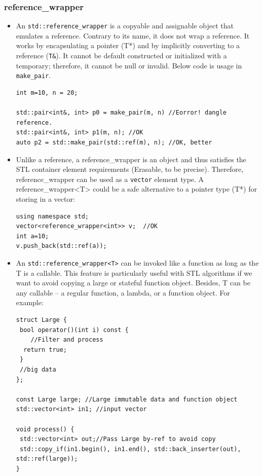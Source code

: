 \documentclass[a4paper,11pt,twoside]{book}
\begin{document}
\subsubsection{reference\_wrapper}
\begin{itemize}
    \item An \texttt{std::reference\_wrapper} is a copyable and assignable object that emulates a reference. Contrary to its name, it does not wrap a reference. It works by encapsulating a pointer (T*) and by implicitly converting to a reference (\texttt{T\&}). It cannot be default constructed or initialized with a temporary; therefore, it cannot be null or invalid. Below code is usage in \texttt{make\_pair}. 
\begin{lstlisting}
int m=10, n = 20;

std::pair<int&, int> p0 = make_pair(m, n) //Eorror! dangle reference.
std::pair<int&, int> p1(m, n); //OK
auto p2 = std::make_pair(std::ref(m), n); //OK, better
\end{lstlisting}

    \item Unlike a reference, a reference\_wrapper is an object and thus satisfies the STL container element requirements (Erasable, to be precise). Therefore, reference\_wrapper can be used as a \texttt{vector} element type.  A reference\_wrapper<T> could be a safe alternative to a pointer type (T*) for storing in a vector:
\begin{lstlisting}
using namespace std;
vector<reference_wrapper<int>> v;  //OK
int a=10;
v.push_back(std::ref(a));
\end{lstlisting}
    \item An \texttt{std::reference\_wrapper<T>} can be invoked like a function as long as the T is a callable. This feature is particularly useful with STL algorithms if we want to avoid copying a large or stateful function object.  Besides, T can be any callable – a regular function, a lambda, or a function object. For example:
\begin{lstlisting}
struct Large {
 bool operator()(int i) const {
  	//Filter and process
  return true;
 }
 //big data
};

const Large large; //Large immutable data and function object
std::vector<int> in1; //input vector

void process() {
 std::vector<int> out;//Pass Large by-ref to avoid copy 
 std::copy_if(in1.begin(), in1.end(), std::back_inserter(out), std::ref(large));  
}
\end{lstlisting}
\end{itemize}
\end{document}
